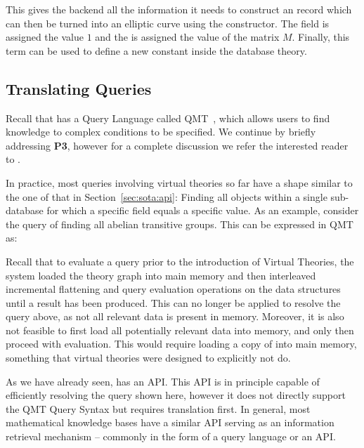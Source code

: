 This gives the backend all the information it needs to construct an \mmt record which can
then be turned into an elliptic curve using the  constructor.
The  field is assigned the value
$1$ and the  is assigned the value of the matrix $M$.  Finally,
this \mmt term can be used to define a new constant inside the database theory.

\subsection{Translating Queries}

Recall that \mmt has a Query Language called QMT~\cite{Rabe:qlfml12}, which allows users to find knowledge to complex conditions to be specified. 
We continue by briefly addressing \textbf{P3}, however for a complete discussion we refer the interested reader to \cite{twiesing:msc17}. 

In practice, most queries involving virtual theories so far have a shape similar to the one of that in Section~\ref{sec:sota:api}: 
Finding all objects within a single sub-database for which a specific field equals a specific value. 
As an example, consider the query of finding all abelian transitive groups. 
This can be expressed in QMT as:

Recall that to evaluate a query prior to the introduction of Virtual Theories, the \mmt system loaded the theory graph into main memory and then interleaved incremental flattening and query evaluation operations on the \mmt data structures until a result has been produced. 
This can no longer be applied to resolve the query above, as not all relevant data is present in memory. 
Moreover, it is also not feasible to first load all potentially relevant data into memory, and only then proceed with evaluation. 
This would require loading a copy of \lmfdb into main memory, something that virtual theories were designed to explicitly not do. 

As we have already seen, \lmfdb has an API. 
This API is in principle capable of efficiently resolving the query shown here, however it does not directly support the QMT Query Syntax but requires translation first. 
In general, most mathematical knowledge bases have a similar API serving as an information retrieval mechanism -- commonly in the form of a query language or an API. 

